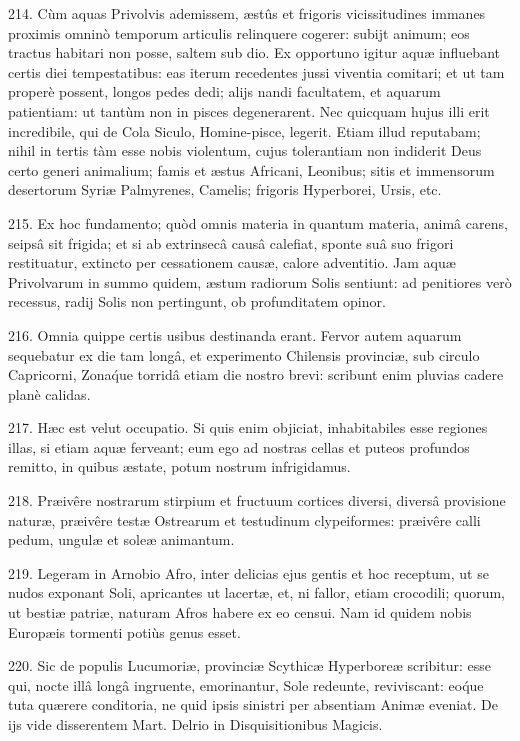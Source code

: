 \documentclass[a4paper, 11pt, oneside, polutonikogreek, german]{article}
\begin{document}
214. Cùm aquas Privolvis ademissem, æstûs et frigoris vicissitudines immanes proximis omninò temporum articulis relinquere cogerer: subijt animum; eos tractus habitari non posse, saltem sub dio. Ex opportuno igitur aquæ influebant certis diei tempestatibus: eas iterum recedentes jussi viventia comitari; et ut tam properè possent, longos pedes dedi; alijs nandi facultatem, et aquarum patientiam: ut tantùm non in pisces degenerarent. Nec quicquam hujus illi erit incredibile, qui de Cola Siculo, Homine-pisce, legerit. Etiam illud reputabam; nihil in tertis tàm esse nobis violentum, cujus tolerantiam non indiderit Deus certo generi animalium; famis et æstus Africani, Leonibus; sitis et immensorum desertorum Syriæ Palmyrenes, Camelis; frigoris Hyperborei, Ursis, etc.

215. Ex hoc fundamento; quòd omnis materia in quantum materia, animâ carens, seipsâ sit frigida; et si ab extrinsecâ causâ calefiat, sponte suâ suo frigori restituatur, extincto per cessationem causæ, calore adventitio. Jam aquæ Privolvarum in summo quidem, æstum radiorum Solis sentiunt: ad penitiores verò recessus, radij Solis non pertingunt, ob profunditatem opinor.

216. Omnia quippe certis usibus destinanda erant. Fervor autem aquarum sequebatur ex die tam longâ, et experimento Chilensis provinciæ, sub circulo Capricorni, Zona\'que torridâ etiam die nostro brevi: scribunt enim pluvias cadere planè calidas.

217. Hæc est velut occupatio. Si quis enim objiciat, inhabitabiles esse regiones illas, si etiam aquæ ferveant; eum ego ad nostras cellas et puteos profundos remitto, in quibus æstate, potum nostrum infrigidamus.

218. Præivêre nostrarum stirpium et fructuum cortices diversi, diversâ provisione naturæ, præivêre testæ Ostrearum et testudinum clypeiformes: præivêre calli pedum, ungulæ et soleæ animantum.

219. Legeram in Arnobio Afro, inter delicias ejus gentis et hoc receptum, ut se nudos exponant Soli, apricantes ut lacertæ, et, ni fallor, etiam crocodili; quorum, ut bestiæ patriæ, naturam Afros habere ex eo censui. Nam id quidem nobis Europæis tormenti potiùs genus esset.

220. Sic de populis Lucumoriæ, provinciæ Scythicæ Hyperboreæ scribitur: esse qui, nocte illâ longâ ingruente, emorinantur, Sole redeunte, reviviscant: eo\'que tuta quærere conditoria, ne quid ipsis sinistri per absentiam Animæ eveniat. De ijs vide disserentem Mart. Delrio in Disquisitionibus Magicis.
\end{document}
